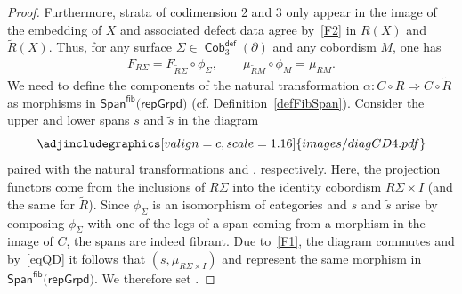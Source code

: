 \documentclass[pdftex]{sigma}
\DeclareMathOperator{\Cob}{\mathsf{Cob}}
\newcommand{\sslash}{\mathbin{/\mkern-6mu/}}
\numberwithin{equation}{section}
\theoremstyle{definition}
\begin{document}
\begin{proof}
 Furthermore, strata of codimension 2 and 3 only appear in the image of the embedding of $X$ and associated defect data agree by~\ref{F2} in $R(X)$ and $\widetilde{R}(X)$. Thus, for any surface $\Sigma \in \Cob_3^{\mathsf{def}}(\partial)$ and any cobordism $M$, one has
 \begin{align}
 \label{eqQD}
 F_{R\Sigma} = F_{\widetilde{R}\Sigma} \circ \phi_{\Sigma}, \qquad \mu_{\widetilde{R}M} \circ \phi_M = \mu_{RM}.
 \end{align}
 We need to define the components \smash{$\alpha_{\Sigma}\colon \mathcal{A}^{R(\Sigma)}\sslash \mathcal{G}^{R(\Sigma)} \rightarrow \mathcal{A}^{\widetilde{R}(\Sigma)}\sslash \mathcal{G}^{\widetilde{R}(\Sigma)}$} of the natural transformation $\alpha\colon C \circ R \Rightarrow C \circ \widetilde{R}$ as morphisms in $\mathsf{Span}^{\mathsf{fib}}(\mathsf{repGrpd)}$ (cf. Definition~\ref{defFibSpan}). Consider the upper and lower spans $s$ and $\widetilde{s}$ in the diagram
 \[
 \centering
 \adjincludegraphics[valign=c, scale = 1.16]{images/diagCD4.pdf}
 \]
 paired with the natural transformations  and , respectively. Here, the projection functors  come from the inclusions of $R\Sigma$ into the identity cobordism $R\Sigma \times I$ (and the same for $\widetilde{R}$). Since $\phi_{\Sigma}$ is an isomorphism of categories and $s$ and $\widetilde{s}$ arise by composing $\phi_{\Sigma}$ with one of the legs of a span coming from a morphism in the image of $C$, the spans are indeed fibrant. Due to~\ref{F1}, the diagram commutes and by~\eqref{eqQD} it follows that $(s, \mu_{R\Sigma \times I})$ and  represent the same morphism in $\mathsf{Span}^{\mathsf{fib}}(\mathsf{repGrpd)}$. We therefore set .


\end{proof}
\end{document}
